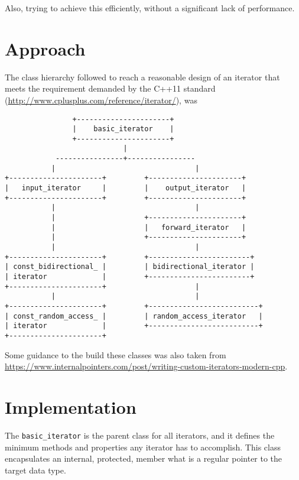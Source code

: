 Also, trying to achieve this efficiently, without a significant lack of performance.

\section{ Approach }

The class hierarchy followed to reach a reasonable design of an iterator that meets the requirement demanded by the C++11 standard (\url{http://www.cplusplus.com/reference/iterator/}), was

\begin{verbatim}
                +----------------------+
                |    basic_iterator    |
                +----------------------+
                            |
            ----------------+----------------
           |                                 |
+----------------------+         +----------------------+
|   input_iterator     |         |    output_iterator   |
+----------------------+         +----------------------+
           |                                 |
           |                     +----------------------+
           |                     |   forward_iterator   |
           |                     +----------------------+
           |                                 |
+----------------------+         +------------------------+
| const_bidirectional_ |         | bidirectional_iterator |
| iterator             |         +------------------------+
+----------------------+                     |
           |                                 |
+----------------------+         +--------------------------+
| const_random_access_ |         | random_access_iterator   |
| iterator             |         +--------------------------+
+----------------------+
\end{verbatim}

Some guidance to the build these classes was also taken from \linebreak \url{https://www.internalpointers.com/post/writing-custom-iterators-modern-cpp}. 
\\

\section{Implementation}

The {\tt basic\_iterator} is the parent class for all iterators, and it defines the minimum methods and properties any iterator has to accomplish. This class encapsulates an internal, protected, member what is  a regular pointer to the target data type.
\\

